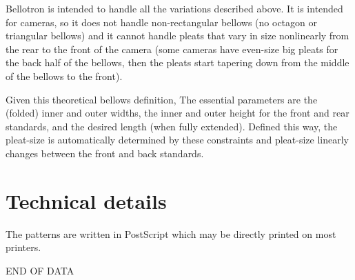 \documentclass[dvips,12pt]{article}
\begin{document}
Bellotron is intended to handle all the variations described above. It is
intended for cameras, so it does
not handle non-rectangular bellows (no octagon or triangular bellows)
and it cannot handle pleats that vary in size nonlinearly from the rear
to the front of the camera (some cameras have even-size big pleats for the back half
of the bellows, then the pleats start tapering down from the middle of the bellows 
to the front).

Given this theoretical bellows definition, The essential parameters are the (folded) 
inner and outer widths, the inner and outer height for the front and rear standards, and 
the desired length (when fully extended). Defined this way, the pleat-size is automatically
determined by these constraints and pleat-size linearly changes between the front and 
back standards. 

\section{Technical details}

The patterns are written in PostScript which may be directly printed on most printers.


\centering
\vspace{2cm}
END OF DATA
\appendix
\end{document}
